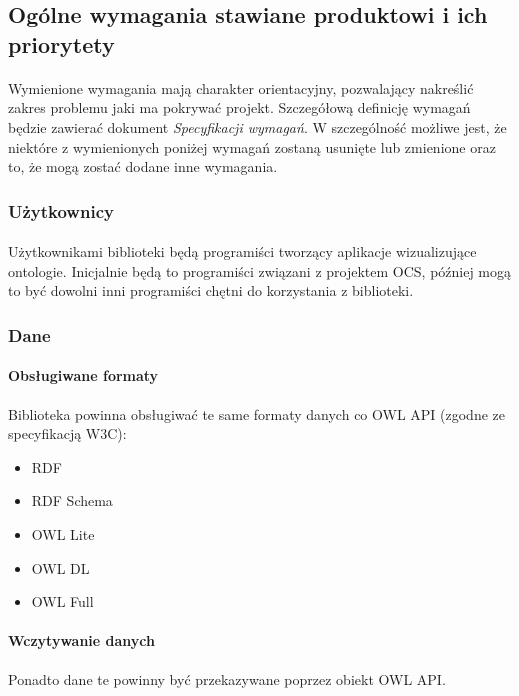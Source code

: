 \subsection{Ogólne wymagania stawiane produktowi i ich priorytety}
\paragraph{} Wymienione wymagania mają charakter orientacyjny, pozwalający nakreślić zakres problemu jaki ma pokrywać projekt. Szczegółową definicję wymagań będzie zawierać dokument \textit{Specyfikacji wymagań}. W szczególność możliwe jest, że niektóre z wymienionych poniżej wymagań zostaną usunięte lub zmienione oraz to, że mogą zostać dodane inne wymagania.

\subsubsection{Użytkownicy}
\paragraph{} Użytkownikami biblioteki będą programiści tworzący aplikacje wizualizujące ontologie. Inicjalnie będą to programiści związani z projektem OCS, później mogą to być dowolni inni programiści chętni do korzystania z biblioteki.
\subsubsection{Dane}

\paragraph{Obsługiwane formaty} 
Biblioteka powinna obsługiwać te same formaty danych co OWL API (zgodne ze specyfikacją W3C):
\begin{itemize}
 	\item RDF
	\item RDF Schema
	\item OWL Lite
	\item OWL DL
	\item OWL Full
\end{itemize}

\paragraph{Wczytywanie danych}Ponadto dane te powinny być przekazywane poprzez obiekt OWL API.

